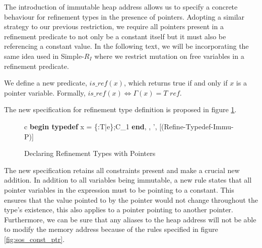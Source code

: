 \documentclass[a4paper,12pt]{report}
\begin{document}
\par
The introduction of immutable heap address allows us to specify a concrete 
behaviour for refinement types in the presence of pointers. Adopting a similar 
strategy to our previous restriction, we require all pointers present in a 
refinement predicate to not only be a constant itself but it must also be 
referencing a constant value. In the following text, we will be incorporating 
the same idea used in Simple-$R_{I}$ where we 
restrict mutation on free variables in a refinement predicate. 

\par
We define a new predicate, $is\_ref(x)$, which returns true if and only if $x$ 
is a pointer variable. Formally, $is\_ref(x) \Leftrightarrow \Gamma(x) = T\textit{ ref}$.
\par
The new specification for refinement type definition 
is proposed in figure \ref{fig:immu_pointer_typedef}.

\begin{figure}[h]
  \begin{center}
    \begin{tabular}{c}
      {\langle \textbf{begin typedef } x = \{\upsilon :T\text{ }|\text{ }e\};C_1\textbf{ end}, 
      \sigma, \tau \rangle \longrightarrow 
        \langle \sigma', \tau \rangle}[(Refine-Typedef-Immu-P)]
    \end{tabular}
  \end{center}
  \caption{Declaring Refinement Types with Pointers}
  \label{fig:immu_pointer_typedef}
\end{figure}

\par
The new specification retains all constraints present and make a crucial 
new addition. In addition to all variables being immutable, a new rule states 
that all pointer variables in the expression must to be pointing to a constant.  
This ensures that the value pointed 
to by the pointer would not change throughout the type's existence, 
this also applies to a pointer pointing to another pointer. Furthermore, 
we can be sure that any aliases to the heap 
address will not be able to modify the memory address because of the rules 
specified in figure \ref{fig:sos_const_ptr}.
\end{document}
